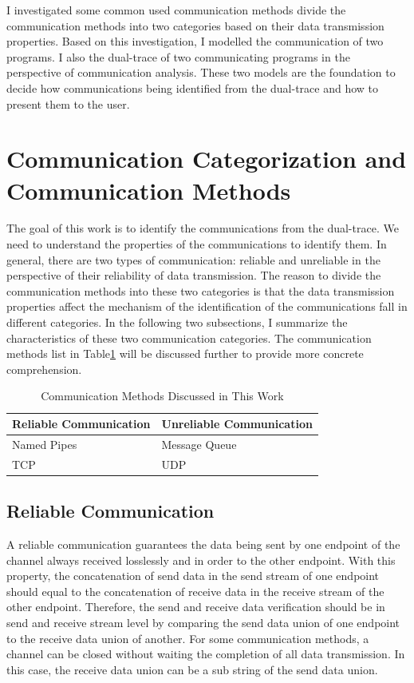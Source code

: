 
\label{chapter:Mod}
I investigated some common used communication methods divide the communication methods into two categories based on their data transmission properties. Based on this investigation, I modelled the communication of two programs. I also the dual-trace of two communicating programs in the perspective of communication analysis. These two models are the foundation to decide how communications being identified from the dual-trace and how to present them to the user.

\section{Communication Categorization and Communication Methods}
The goal of this work is to identify the communications from the dual-trace. We need to understand the properties of the communications to identify them. In general, there are two types of communication: reliable and unreliable in the perspective of their reliability of data transmission. The reason to divide the communication methods into these two categories is that the data transmission properties affect the mechanism of the identification of the communications fall in different categories. In the following two subsections, I summarize the characteristics of these two communication categories. The communication methods list in Table\ref{methodsInCategories} will be discussed further to provide more concrete comprehension. 
\begin{table}[H]
\centering
\caption{Communication Methods Discussed in This Work}
\label{methodsInCategories}
\begin{tabular}{|l|l|}
 \hline
\textbf{Reliable Communication}& \textbf{Unreliable Communication}\\
 \hline
Named Pipes & Message Queue   \\
TCP &  UDP \\
 \hline
\end{tabular}
\end{table}


\subsection{Reliable Communication}\label{reliable}
A reliable communication guarantees the data being sent by one endpoint of the channel always received losslessly and in order to the other endpoint. With this property, the concatenation of send data in the send stream of one endpoint should equal to the concatenation of receive data in the receive stream of the other endpoint. Therefore, the send and receive data verification should be in send and receive stream level by comparing the send data union of one endpoint to the receive data union of another. For some communication methods, a channel can be closed without waiting the completion of all data transmission. In this case, the receive data union can be a sub string of the send data union.

